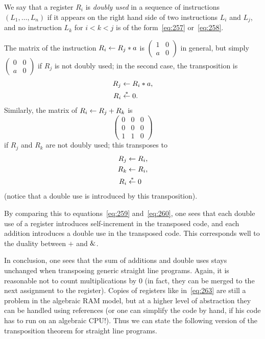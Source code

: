 \begin{definition}
  We say that a register $R_i$ is \emph{doubly used}
  in a sequence of instructions $(L_1,\ldots,L_n)$ if it appears on
  the right hand side of two instructions $L_i$ and $L_j$, and no
  instruction $L_k$ for $i<k<j$ is of the form~\eqref{eq:257}
  or~\eqref{eq:258}.
\end{definition}

The matrix of the instruction $R_i\leftarrow R_j*a$ is
$\left(\begin{smallmatrix}1&0\\a&0\end{smallmatrix}\right)$ in
general, but simply
$\left(\begin{smallmatrix}0&0\\a&0\end{smallmatrix}\right)$ if $R_j$
is not doubly used; in the second case, the transposition is
\begin{equation}
  \label{eq:262}
  \begin{aligned}
    R_j&\leftarrow R_i*a\text{,}\\
    R_i&\overset{*}{\leftarrow} 0\text{.}
  \end{aligned}
\end{equation}
Similarly, the matrix of $R_i\leftarrow R_j+R_k$ is 
\begin{equation}
  \label{eq:265}
  \begin{pmatrix}
    0 & 0 & 0\\
    0 & 0 & 0\\
    1 & 1 & 0
  \end{pmatrix}
\end{equation}
if $R_j$ and $R_k$ are not doubly used; this transposes to
\begin{equation}
  \label{eq:263}
  \begin{aligned}
    R_j &\leftarrow R_i\text{,}\\
    R_k &\leftarrow R_i\text{,}\\
    R_i &\overset{*}{\leftarrow} 0
  \end{aligned}
\end{equation}
(notice that a double use is introduced by this transposition).

By comparing this to equations~\eqref{eq:259} and~\eqref{eq:260}, one
sees that each double use of a register introduces self-increment in
the transposed code, and each addition introduces a double use in the
transposed code. This corresponds well to the duality between $+$ and
$\operatorname{\&}$.

In conclusion, one sees that the sum of additions and double uses
stays unchanged when transposing generic straight line
programs. Again, it is reasonable not to count multiplications by $0$
(in fact, they can be merged to the next assignment to the register).
Copies of registers like in~\eqref{eq:263} are still a problem in the
algebraic RAM model, but at a higher level of abstraction they can be
handled using references (or one can simplify the code by hand, if his
code has to run on an algebraic CPU!). Thus we can state the following
version of the transposition theorem for straight line programs.

